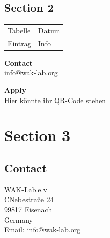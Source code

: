 \subsection{\large{Section 2}}
\noindent
\begin{tabular}{@{}ll}
	Tabelle & Datum\\
	Eintrag    & Info\\
\end{tabular}

{\large\textbf{{Contact}}}\\
\url{info@wak-lab.org}

\begin{center}
\textbf{Apply} \\
Hier könnte ihr QR-Code stehen\\
\end{center}

\newpage

\section{\large{Section 3}}


\subsection{\large{Contact}}
WAK-Lab.e.v\\
CNebestraße 24\\
99817 Eisenach\\
Germany\\
Email:  \url{info@wak-lab.org}

\newpage
\vspace*{\fill}
\begin{center}
\end{center}
\vspace*{\fill}



